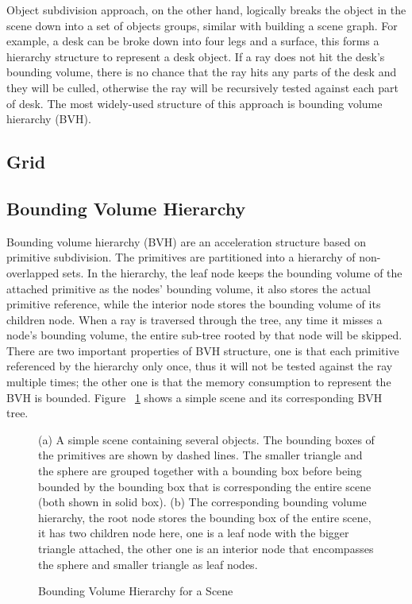 Object subdivision approach, on the other hand, logically breaks the object in the scene down into a set of objects groups, similar with building a scene graph. For example, a desk can be broke down into four legs and a surface, this forms a hierarchy structure to represent a desk object. If a ray does not hit the desk's bounding volume, there is no chance that the ray hits any parts of the desk and they will be culled, otherwise the ray will be recursively tested against each part of desk. The most widely-used structure of this approach is bounding volume hierarchy (BVH).

\subsection{Grid}




\subsection{Bounding Volume Hierarchy}

Bounding volume hierarchy (BVH) are an acceleration structure based on primitive subdivision. The primitives are partitioned into a hierarchy of non-overlapped sets. In the hierarchy, the leaf node keeps the bounding volume of the attached primitive as the nodes' bounding volume, it also stores the actual primitive reference, while the interior node stores the bounding volume of its children node. When a ray is traversed through the tree, any time it misses a node's bounding volume, the entire sub-tree rooted by that node will be skipped. There are two important properties of BVH structure, one is that each primitive referenced by the hierarchy only once,  thus it will not be tested against the ray multiple times; the other one is that the memory consumption to represent the BVH is bounded. Figure ~\ref{fig:BVH} shows a simple scene and its corresponding BVH tree.

\begin{figure}[htp] 
	\renewcommand{\thefigure}{\thechapter.\arabic{figure}}
	\caption{Bounding Volume Hierarchy for a Scene}{(a) A simple scene containing several objects. The bounding boxes of the primitives are shown by dashed lines. The smaller triangle and the sphere are grouped together with a bounding box before being bounded by the bounding box that is corresponding the entire scene (both shown in solid box). (b) The corresponding bounding volume hierarchy, the root node stores the bounding box of the entire scene, it has two children node here, one is a leaf node with the bigger triangle attached, the other one is an interior node that encompasses the sphere and smaller triangle as leaf nodes. }
	\label{fig:BVH} 
\end{figure}

